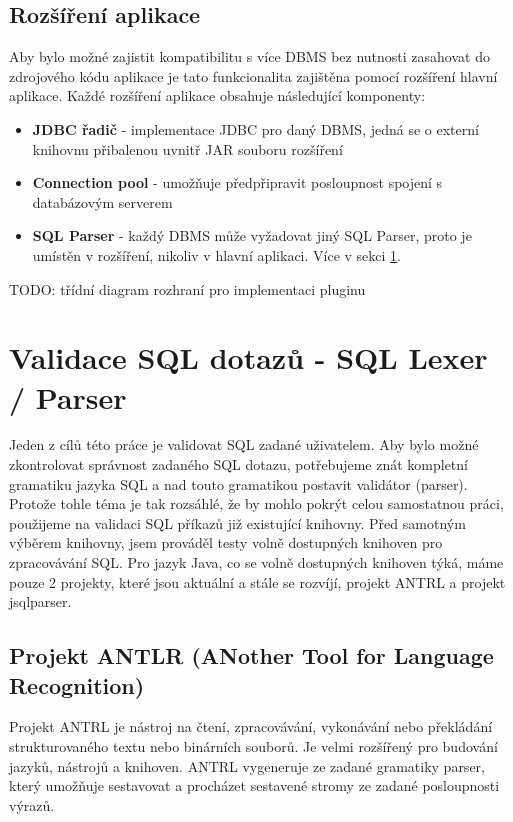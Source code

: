 \documentclass[czech,bachelor,public,dept460,male,cpdeclaration,twoside]{diploma}
\begin{document}
\subsection{Rozšíření aplikace} \label{plugins}
Aby bylo možné zajistit kompatibilitu s více DBMS bez nutnosti zasahovat do zdrojového kódu aplikace je tato funkcionalita zajištěna pomocí rozšíření hlavní aplikace. Každé rozšíření aplikace obsahuje následující komponenty:
\begin{itemize}
\item \textbf{JDBC řadič} - implementace JDBC pro daný DBMS, jedná se o externí knihovnu přibalenou uvnitř JAR souboru rozšíření
\item \textbf{Connection pool} - umožňuje předpřipravit posloupnost spojení s databázovým serverem
\item \textbf{SQL Parser} - každý DBMS může vyžadovat jiný SQL Parser, proto je umístěn v rozšíření, nikoliv v hlavní aplikaci. Více v sekci \ref{parsers}. 
\end{itemize}

TODO: třídní diagram rozhraní pro implementaci pluginu




\newpage
\section{Validace SQL dotazů - SQL Lexer / Parser} \label{parsers}
Jeden z cílů této práce je validovat SQL zadané uživatelem. Aby bylo možné zkontrolovat správnost zadaného SQL dotazu, potřebujeme znát kompletní gramatiku jazyka SQL a nad touto gramatikou postavit validátor (parser). Protože tohle téma je tak rozsáhlé, že by mohlo pokrýt celou samostatnou práci, použijeme na validaci SQL příkazů již existující knihovny. Před samotným výběrem knihovny, jsem prováděl testy volně dostupných knihoven pro zpracovávání SQL. Pro jazyk Java, co se volně dostupných knihoven týká, máme pouze 2 projekty, které jsou aktuální a stále se rozvíjí, projekt ANTRL a projekt jsqlparser.


\subsection{Projekt ANTLR (ANother Tool for Language Recognition)}
Projekt ANTRL je nástroj na čtení, zpracovávání, vykonávání nebo překládání strukturovaného textu nebo binárních souborů. Je velmi rozšířený pro budování jazyků, nástrojů a knihoven. ANTRL vygeneruje ze zadané gramatiky parser, který umožňuje sestavovat a procházet sestavené stromy ze zadané posloupnosti výrazů. \cite{antrl}
\end{document}
